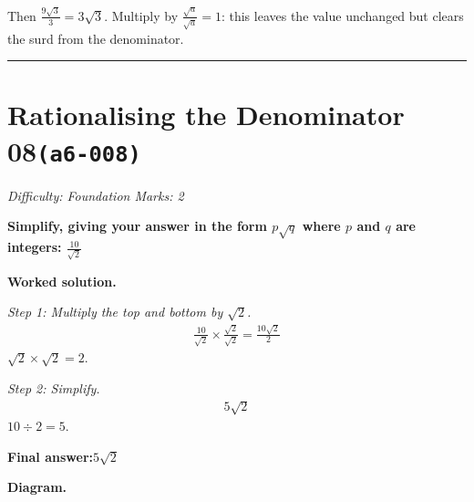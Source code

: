 \documentclass[11pt]{article}
\newcommand{\question}[1]{\par\medskip\noindent\textbf{#1}\par}
\begin{document}
\begin{center}
\end{center}
\small Then $\frac{9\sqrt3}{3}=3\sqrt3$. Multiply by $\frac{\sqrt{a}}{\sqrt{a}}=1$: this leaves the value unchanged but clears the surd from the denominator.\normalsize

\medskip\hrule

\section*{Rationalising the Denominator 08\quad\small\texttt{(a6-008)}}
\textit{Difficulty: Foundation \quad\textbar\quad Marks: 2}

\question{Simplify, giving your answer in the form \( p\sqrt{q} \) where \( p \) and \( q \) are integers: \( \frac{10}{\sqrt{2}} \)}

\textbf{Worked solution.}

\textit{Step 1: Multiply the top and bottom by \( \sqrt{2} \).}
\[\begin{gathered}
\frac{10}{\sqrt{2}} \times \frac{\sqrt{2}}{\sqrt{2}} = \frac{10\sqrt{2}}{2}
\end{gathered}\]
\( \sqrt{2} \times \sqrt{2} = 2 \).

\textit{Step 2: Simplify.}
\[\begin{gathered}
5\sqrt{2}
\end{gathered}\]
\( 10 \div 2 = 5 \).

\begin{answerbox}
\textbf{Final answer:}\quad \(\displaystyle 5\sqrt{2}\)
\end{answerbox}
\textbf{Diagram.}
\end{document}
